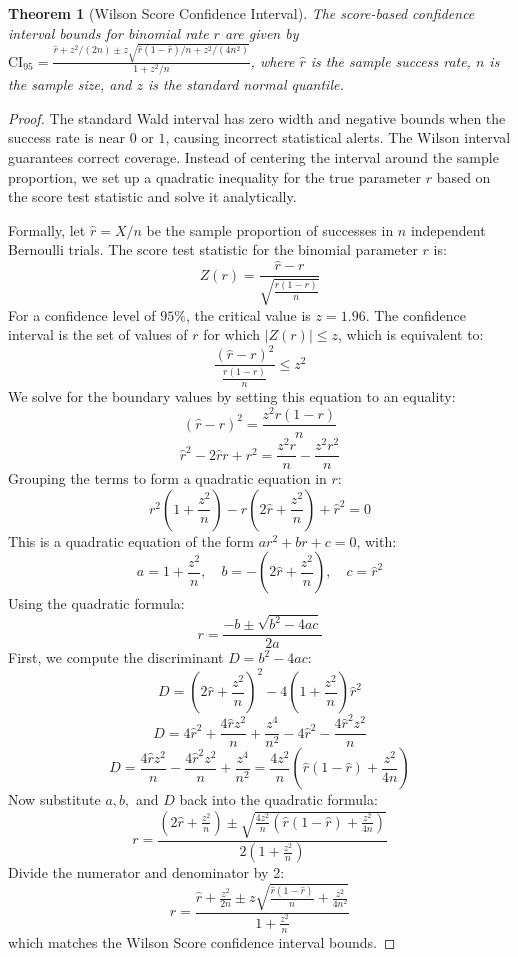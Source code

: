 \documentclass[11pt,a4paper]{article}
\theoremstyle{plain}
\newtheorem{theorem}{Theorem}[section]
\theoremstyle{definition}
\theoremstyle{remark}
\begin{document}
\begin{theorem}[Wilson Score Confidence Interval]\label{thm:wilson}
The score-based confidence interval bounds for binomial rate $r$ are given by $\mathrm{CI}_{95} = \frac{\hat{r} + z^2/(2n) \pm z\sqrt{\hat{r}(1-\hat{r})/n + z^2/(4n^2)}}{1 + z^2/n}$, where $\hat{r}$ is the sample success rate, $n$ is the sample size, and $z$ is the standard normal quantile.
\end{theorem}
\begin{proof}
The standard Wald interval has zero width and negative bounds when the success rate is near $0$ or $1$, causing incorrect statistical alerts. The Wilson interval guarantees correct coverage. Instead of centering the interval around the sample proportion, we set up a quadratic inequality for the true parameter $r$ based on the score test statistic and solve it analytically.

Formally, let $\hat{r} = X/n$ be the sample proportion of successes in $n$ independent Bernoulli trials. The score test statistic for the binomial parameter $r$ is:
$$Z(r) = \frac{\hat{r} - r}{\sqrt{\frac{r(1-r)}{n}}}$$
For a confidence level of $95\%$, the critical value is $z = 1.96$. The confidence interval is the set of values of $r$ for which $|Z(r)| \le z$, which is equivalent to:
$$\frac{(\hat{r} - r)^2}{\frac{r(1-r)}{n}} \le z^2$$
We solve for the boundary values by setting this equation to an equality:
$$(\hat{r} - r)^2 = \frac{z^2 r(1-r)}{n}$$
$$\hat{r}^2 - 2\hat{r}r + r^2 = \frac{z^2 r}{n} - \frac{z^2 r^2}{n}$$
Grouping the terms to form a quadratic equation in $r$:
$$r^2 \left( 1 + \frac{z^2}{n} \right) - r \left( 2\hat{r} + \frac{z^2}{n} \right) + \hat{r}^2 = 0$$
This is a quadratic equation of the form $a r^2 + b r + c = 0$, with:
$$a = 1 + \frac{z^2}{n}, \quad b = -\left(2\hat{r} + \frac{z^2}{n}\right), \quad c = \hat{r}^2$$
Using the quadratic formula:
$$r = \frac{-b \pm \sqrt{b^2 - 4ac}}{2a}$$
First, we compute the discriminant $D = b^2 - 4ac$:
$$D = \left( 2\hat{r} + \frac{z^2}{n} \right)^2 - 4 \left( 1 + \frac{z^2}{n} \right) \hat{r}^2$$
$$D = 4\hat{r}^2 + \frac{4\hat{r}z^2}{n} + \frac{z^4}{n^2} - 4\hat{r}^2 - \frac{4\hat{r}^2 z^2}{n}$$
$$D = \frac{4\hat{r}z^2}{n} - \frac{4\hat{r}^2 z^2}{n} + \frac{z^4}{n^2} = \frac{4z^2}{n} \left( \hat{r}(1-\hat{r}) + \frac{z^2}{4n} \right)$$
Now substitute $a, b,$ and $D$ back into the quadratic formula:
$$r = \frac{\left(2\hat{r} + \frac{z^2}{n}\right) \pm \sqrt{\frac{4z^2}{n} \left( \hat{r}(1-\hat{r}) + \frac{z^2}{4n} \right)}}{2\left(1 + \frac{z^2}{n}\right)}$$
Divide the numerator and denominator by 2:
$$r = \frac{\hat{r} + \frac{z^2}{2n} \pm z\sqrt{\frac{\hat{r}(1-\hat{r})}{n} + \frac{z^2}{4n^2}}}{1 + \frac{z^2}{n}}$$
which matches the Wilson Score confidence interval bounds.
\end{proof}
\end{document}
